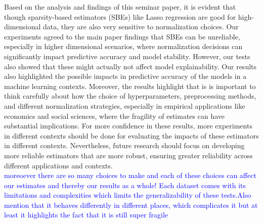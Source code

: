Based on the analysis and findings of this seminar paper, it is evident that though sparsity-based estimators (SBEs) like Lasso regression are good for high-dimensional data, they are also very sensitive to normalization choices. Our experiments agreed to the main paper findings that SBEs can be unreliable, especially in higher dimensional scenarios, where normalization decisions can significantly impact predictive accuracy and model stability. However, our tests also showed that these might actually not affect model explainability. Our results also highlighted the possible impacts in predictive accuracy of the models in a machine learning contexts. Moreover, the results highlight that is is important to think carefully about how the choice of hyperparameters, preprocessing methods, and different normalization strategies, especially in empirical applications like economics and social sciences, where the fragility of estimates can have substantial implications.  For more confidence in these results, more experiments in different contexts should be done for evaluating the impacts of these estimators in different contexts. Nevertheless, future research should focus on developing more reliable estimators that are more robust, ensuring greater reliability across different applications and contexts.\\

\textcolor{blue}{moreoever there are so many choices to make and each of these choices can affect our estimates and thereby our results as a whole!  
 Each dataset comes with its limitations and complexities which limits the generalizability of these tests.Also mention that it behaves differently in different places, which complicates it but at least it highlights the fact that it is still super fragile}